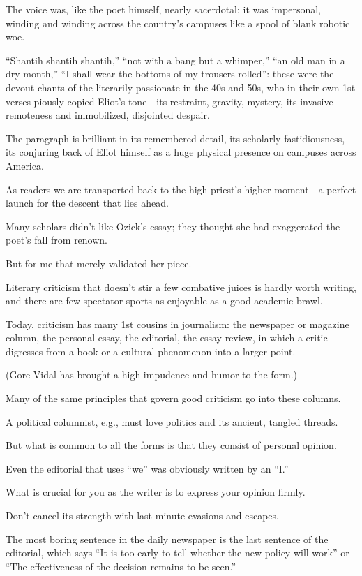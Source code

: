 \documentclass{book}
\numberwithin{equation}{section}
\begin{document}
The voice was, like the poet himself, nearly sacerdotal; it was impersonal, winding and winding across the country's campuses like a spool of blank robotic woe.

``Shantih shantih shantih,'' ``not with a bang but a whimper,'' ``an old man in a dry month,'' ``I shall wear the bottoms of my trousers rolled'': these were the devout chants of the literarily passionate in the 40s and 50s, who in their own 1st verses piously copied Eliot's tone - its restraint, gravity, mystery, its invasive remoteness and immobilized, disjointed despair.

%
The paragraph is brilliant in its remembered detail, its scholarly fastidiousness, its conjuring back of Eliot himself as a huge physical presence on campuses across America.

As readers we are transported back to the high priest's higher moment - a perfect launch for the descent that lies ahead.

Many scholars didn't like Ozick's essay; they thought she had exaggerated the poet's fall from renown.

But for me that merely validated her piece.

Literary criticism that doesn't stir a few combative juices is hardly worth writing, and there are few spectator sports as enjoyable as a good academic brawl.

%
Today, criticism has many 1st cousins in journalism: the newspaper or magazine column, the personal essay, the editorial, the essay-review, in which a critic digresses from a book or a cultural phenomenon into a larger point.

(Gore Vidal has brought a high impudence and humor to the form.)

Many of the same principles that govern good criticism go into these columns.

A political columnist, e.g., must love politics and its ancient, tangled threads.

%
But what is common to all the forms is that they consist of personal opinion.

Even the editorial that uses ``we'' was obviously written by an ``I.''

What is crucial for you as the writer is to express your opinion firmly.

Don't cancel its strength with last-minute evasions and escapes.

The most boring sentence in the daily newspaper is the last sentence of the editorial, which says ``It is too early to tell whether the new policy will work'' or ``The effectiveness of the decision remains to be seen.''
\end{document}
